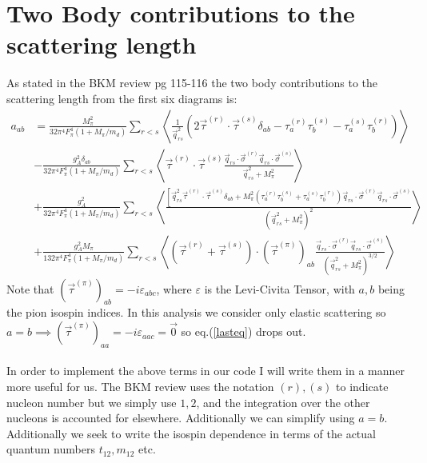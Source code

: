 \documentclass[11pt]{article}
\begin{document}
\section{Two Body contributions to the scattering length}
As stated in the BKM review pg 115-116 the two body contributions to the scattering length from the first six diagrams is:
\begin{align}
    a_{ab}&= \frac{M_\pi^2}{32 \pi^4 F_\pi^4\left(1+M_\pi / m_d\right)} \sum_{r<s}\left\langle\frac{1}{\vec{q}_{r s}^2}\left(2 \vec{\tau}^{(r)} \cdot \vec{\tau}^{(s)} \delta_{a b}-\tau_a^{(r)} \tau_b^{(s)}-\tau_a^{(s)} \tau_b^{(r)}\right)\right\rangle\\
          & -\frac{g_A^2 \delta_{a b}}{32 \pi^4 F_\pi^4\left(1+M_\pi / m_d\right)} \sum_{r<s}\left\langle\vec{\tau}^{(r)} \cdot \vec{\tau}^{(s)} \frac{\vec{q}_{r s} \cdot \vec{\sigma}^{(r)} \vec{q}_{r s} \cdot \vec{\sigma}^{(s)}}{\vec{q}_{r s}^2+M_\pi^2}\right\rangle \\
          &+\frac{g_A^2}{32 \pi^4 F_\pi^4\left(1+M_\pi / m_d\right)} \sum_{r<s}\left\langle\frac{\left[\vec{q}_{r s}^2 \vec{\tau}^{(r)} \cdot \vec{\tau}^{(s)} \delta_{a b}+M_\pi^2\left(\tau_a^{(r)} \tau_b^{(s)}+\tau_a^{(s)} \tau_b^{(r)}\right) \vec{q}_{r s} \cdot \vec{\sigma}^{(r)} \vec{q}_{r s} \cdot \vec{\sigma}^{(s)}\right.}{\left(\vec{q}_{r s}^2+M_\pi^2\right)^2}\right\rangle \\
          &+\frac{g_A^2 M_\pi}{132 \pi^4 F_\pi^4\left(1+M_\pi / m_d\right)} \sum_{r<s}\left\langle\left(\vec{\tau}^{(r)}+\vec{\tau}^{(s)}\right) \cdot\left(\vec{\tau}^{(\pi)}\right)_{a b} \frac{\vec{q}_{r s} \cdot \vec{\sigma}^{(r)} \vec{q}_{r s} \cdot \vec{\sigma}^{(s)}}{\left(\vec{q}_{r s}^2+M_\pi^2\right)^{3 / 2}}\right\rangle\label{lasteq}
\end{align}
Note that $\left(\vec{\tau}^{(\pi)}\right)_{ab}=-i\varepsilon_{abc}$, where $\varepsilon$ is the Levi-Civita Tensor, with $a,b$ being the pion isospin indices.
In this analysis we consider only elastic scattering so $a=b \implies\left(\vec{\tau}^{(\pi)}\right)_{aa}=-i\varepsilon_{aac}=\vec{0}$ so eq.(\ref{lasteq}) drops out.\\~\\
In order to implement the above terms in our code I will write them in a manner more useful for us.
The BKM review uses the notation $(r), (s)$ to indicate nucleon number but we simply use $1,2$, and the integration over the other nucleons is accounted for elsewhere.
Additionally we can simplify using $a=b$.
Additionally we seek to write the isospin dependence in terms of the actual quantum numbers $t_{12}, m_{12}$ etc.
\end{document}

